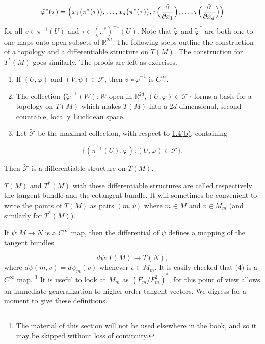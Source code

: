 \begin{equation}
	\label{eq:1.25:3}
	\tilde{\varphi}^{*}(\tau)=\Bigl(x_{1}\bigl(\pi^{*}(\tau)\bigr),\ldots,x_{d}\bigl(\pi^{*}(\tau)\bigr),\tau\Bigl(\frac{\partial}{\partial x_{1}}\Bigr),\ldots,\tau\Bigl(\frac{\partial}{\partial x_{d}}\Bigr)\Bigr)
\end{equation}
for all $v\in\pi^{-1}(U)$ and $\tau\in(\pi^{*})^{-1}(U)$. Note that $\widetilde{\varphi}$ and $\widetilde{\varphi}^*$ are both one-to-one maps onto open subsets of $\mathbb{R}^{2d}$. The following steps outline the construction of a topology and a differentiable structure on $T(M)$. The construction for $T^*(M)$ goes similarly. The proofs are left as exercises.
\begin{enumerate}
	\item[(a)] If $(U,\varphi)$ and $(V,\psi)\in\mathcal{F}$, then $\tilde{\psi}\circ\tilde{\varphi}^{-1}$ is  $ C^{\infty} $.

	\item[(b)] The collection $\{\tilde{\varphi}^{-1}(W)\colon W \text{ open in } \mathbb{R}^{2d}, (U,\varphi) \in \mathcal{F}\}$ forms a basis for a topology on $T(M)$ which makes $T(M)$ into a $2d$-dimensional, second countable, locally Euclidean space.

	\item[(c)] Let $\widetilde{\mathcal{F}}$ be the maximal collection, with respect to \hyperref[thm:1.4]{1.4(b)}, containing
\end{enumerate}
\[
	\{(\pi^{-1}(U),\widetilde{\varphi})\colon(U,\varphi)\in\mathcal{F}\}.
\]

Then $\widetilde{\mathcal{F}}$ is a differentiable structure on $T(M)$.

$T(M)$ and $T^{*}(M)$ with these differentiable structures are called respectively the tangent bundle and the cotangent bundle. It will sometimes be convenient to write the points of $T(M)$ as pairs $(m,v)$ where $m\in M$ and $v\in M_{m}$ (and similarly for $T^{*}(M)$).

If $\psi: M \to N$ is a $C^{\infty}$ map, then the differential of $\psi$ defines a mapping of the tangent bundles

\begin{equation}
	\label{eq:1.25:4}
	d\psi\colon T(M)\to T(N),
\end{equation}
where  $ d\psi(m,v) = d\psi_{m}(v) $ whenever  $ v \in M_{m} $. It is easily checked that (4) is a  $ C^{\infty} $ map.
\label{thm:1.26}\footnote{The material of this section will not be used elsewhere in the book, and so it may be skipped without loss of continuity.}
It is useful to look at $M_{m}$ as $(F_{m}/F_{m}^{2})^{*}$, for this point of view allows an immediate generalization to higher order tangent vectors. We digress for a moment to give these definitions.

